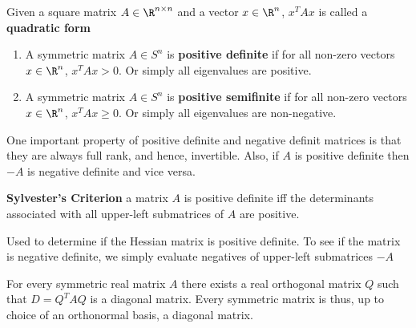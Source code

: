 \documentclass[11pt]{article}
\begin{document}
\begin{defn*}
  Given a square matrix $A\in \R^{n\times n}$ and a vector $x\in \R^n$, $x^TAx$ is called a \textbf{quadratic form}
  \begin{enumerate}
    \item A symmetric matrix $A\in S^n$ is \textbf{positive definite} if for all non-zero vectors $x\in \R^n$, $x^TAx > 0$. Or simply all eigenvalues are positive.
    \item A symmetric matrix $A\in S^n$ is \textbf{positive semifinite} if for all non-zero vectors $x\in \R^n$, $x^TAx \geq 0$. Or simply all eigenvalues are non-negative.
  \end{enumerate}
  \begin{rem}
    One important property of positive definite and negative definit matrices is that they are always full rank, and hence, invertible. Also, if $A$ is positive definite then $-A$ is negative definite and vice versa.
  \end{rem}
\end{defn*}


\begin{defn*}
  \textbf{Sylvester's Criterion} a matrix $A$ is positive definite iff the determinants associated with all upper-left submatrices of $A$ are positive.
  \begin{rem}
    Used to determine if the Hessian matrix is positive definite. To see if the matrix is negative definite, we simply evaluate negatives of upper-left submatrices $-A$
  \end{rem}
\end{defn*}

\begin{theorem*}
  For every symmetric real matrix $A$ there exists a real orthogonal matrix $Q$ such that $D = Q^TAQ$ is a diagonal matrix. Every symmetric matrix is thus, up to choice of an orthonormal basis, a diagonal matrix.
\end{theorem*}
\end{document}
